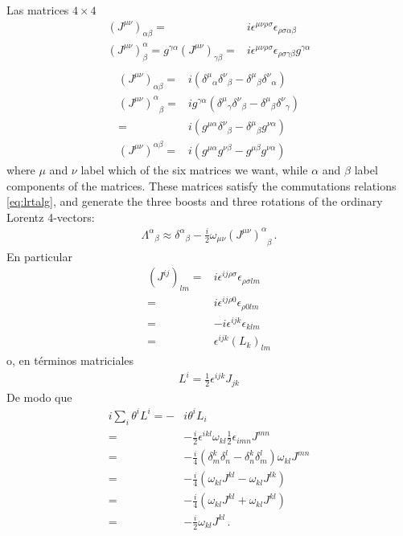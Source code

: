 Las  matrices $4\times 4$ 
\begin{align}
   \left(J^{\mu\nu}\right)_{\alpha\beta}=&i\epsilon^{\mu\nu\rho\sigma}\epsilon_{\rho\sigma\alpha\beta}\nonumber\\
   \left(J^{\mu\nu}\right)^{\alpha}_{\beta}=g^{\gamma\alpha}\left(J^{\mu\nu}\right)_{\gamma\beta}= &i\epsilon^{\mu\nu\rho\sigma}\epsilon_{\rho\sigma\gamma\beta}g^{\gamma\alpha}\nonumber\\
\end{align}
\begin{align}
  \left(J^{\mu\nu}\right)_{\alpha\beta}  =&i\left({\delta^\mu}_\alpha{\delta^\nu}_\beta-{\delta^\mu}_\beta{\delta^\nu}_\alpha\right)\nonumber\\
 {\left(J^{\mu\nu}\right)^{\alpha}}_{\beta}=&ig^{\gamma\alpha}\left({\delta^{\mu}}_{\gamma}{\delta^\nu}_\beta-{\delta^\mu}_\beta{\delta^{\nu}}_\gamma\right) \nonumber\\
 =&i\left(g^{\mu\alpha}{\delta^\nu}_\beta-{\delta^\mu}_\beta g^{\nu\alpha}\right)\nonumber\\
{\left(J^{\mu\nu}\right)^{\alpha\beta}}=&i \left( g^{\mu\alpha}g^{\nu\beta}-g^{\mu\beta}g^{\nu\alpha} \right)
\end{align}
where $\mu$ and $\nu$ label which of the six matrices we want, while $\alpha$ and $\beta$ label components of the matrices. These matrices satisfy the commutations relations \eqref{eq:lrtalg}, and generate the three boosts and three rotations of the ordinary Lorentz 4-vectors:
\begin{align}
  {\Lambda^\alpha}_\beta\approx{\delta^\alpha}_\beta-\frac{i}{2}\omega_{\mu\nu}{\left(J^{\mu\nu}\right)^\alpha}_\beta\,.
\end{align}
En particular
\begin{align*}
  (J^{ij})_{lm}=&i\epsilon^{ij\rho\sigma}\epsilon_{\rho\sigma lm}\\
             =&i\epsilon^{ij\rho 0}\epsilon_{\rho 0 lm}\\
             =&-i\epsilon^{ijk}\epsilon_{klm}\\
             =&\epsilon^{ijk}(L_{k})_{lm}
\end{align*}
o, en términos matriciales
\begin{align}
  L^{i}=\tfrac{1}{2}\epsilon^{ijk}J_{jk}
\end{align}
De modo que
\begin{align}
\label{eq:klkl}
  i\sum_i \theta^{i}L^{i}=-&i\theta^iL_i\nonumber\\
=&- \frac{i}{2}\epsilon^{ikl}\omega_{kl}\frac{1}{2}\epsilon_{imn}J^{mn}\nonumber\\
=&- \frac{i}{4}(\delta^k_m\delta^l_n-\delta^k_n\delta^l_m)\omega_{kl}J^{mn}\nonumber\\
=&- \frac{i}{4}(\omega_{kl}J^{kl}-\omega_{kl}J^{lk})\nonumber\\
=&- \frac{i}{4}(\omega_{kl}J^{kl}+\omega_{kl}J^{kl})\nonumber\\
=&- \frac{i}{2}\omega_{kl}J^{kl}\,.
\end{align}

